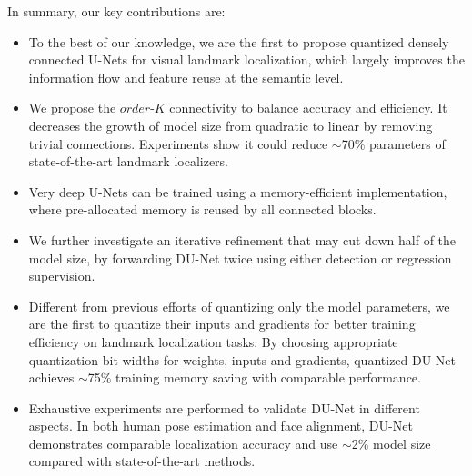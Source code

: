 In summary, our key contributions are:
\begin{itemize}
    \item To the best of our knowledge, we are the first to propose quantized densely connected U-Nets for visual landmark localization, which largely improves the information flow and feature reuse at the semantic level.
    \item We propose the $order$-$K$ connectivity to balance accuracy and efficiency. It decreases the growth of model size from quadratic to linear by removing trivial connections. Experiments show it could reduce $\sim$70\% parameters of state-of-the-art landmark localizers.
    \item Very deep U-Nets can be trained using a memory-efficient implementation, where pre-allocated memory is reused by all connected blocks.
    \item We further investigate an iterative refinement that may cut down half of the model size, by forwarding DU-Net twice using either detection or regression supervision.
    \item Different from previous efforts of quantizing only the model parameters, we are the first to quantize their inputs and gradients for better training efficiency on landmark localization tasks. By choosing appropriate quantization bit-widths for weights, inputs and gradients, quantized DU-Net achieves $\sim$75\% training memory saving with comparable performance. 
    \item Exhaustive experiments are performed to validate DU-Net in different aspects. In both human pose estimation and face alignment, DU-Net demonstrates comparable localization accuracy and use $\sim$2\% model size compared with state-of-the-art methods.
\end{itemize}




